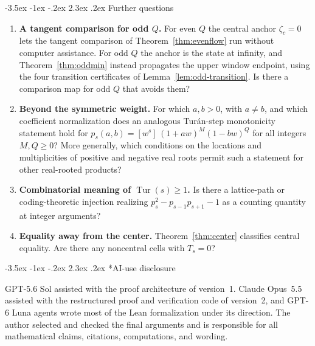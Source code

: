 \documentclass[twoside,10pt]{article}
\makeatletter
\numberwithin{equation}{section}
\theoremstyle{slbody}
\theoremstyle{definition}
\theoremstyle{remark}
\numberwithin{theorem}{section}
\DeclareMathOperator{\Tur}{Tur}
\newcommand{\coeff}[1]{[#1]\,}
\renewcommand{\section}{%
  \@startsection{section}{1}{\z@}%
    {-3.5ex \@plus -1ex \@minus -.2ex}%
    {2.3ex \@plus .2ex}%
    {\normalfont\large\bfseries}}
\makeatother
\begin{document}
\section{Further questions}\label{sec:open}

\begin{enumerate}
\item \textbf{A tangent comparison for odd $Q$.}  For even $Q$ the central
  anchor $\zeta_c=0$ lets the tangent comparison of
  Theorem~\ref{thm:evenflow} run without computer assistance.  For odd $Q$
  the anchor is the state at infinity, and Theorem~\ref{thm:oddmin}
  instead propagates the upper window endpoint, using the four transition
  certificates of Lemma~\ref{lem:odd-transition}.  Is there a comparison map
  for odd $Q$ that avoids them?
\item \textbf{Beyond the symmetric weight.}  For which $a,b>0$, with
  $a\ne b$, and which coefficient normalization does an analogous
  Tur\'an-step monotonicity statement hold for
  $p_s(a,b)=\coeff{w^s}(1+aw)^M(1-bw)^Q$ for all integers $M,Q\ge0$?
  More generally, which conditions on the locations and multiplicities
  of positive and negative real roots permit such a statement for other
  real-rooted products?
\item \textbf{Combinatorial meaning of $\Tur(s)\ge 1$.}
  Is there a lattice-path or coding-theoretic injection
  realizing $p_s^2-p_{s-1}p_{s+1}-1$ as a counting quantity at integer
  arguments?
\item \textbf{Equality away from the center.}  Theorem~\ref{thm:center}
  classifies central equality.  Are there any noncentral cells with
  $T_s=0$?
\end{enumerate}

\noindent\begin{minipage}{\textwidth}
\section*{AI-use disclosure}

GPT-5.6 Sol assisted with the proof architecture of version~1.  Claude
Opus~5.5 assisted with the restructured proof and verification code of
version~2, and GPT-6 Luna agents wrote most of the Lean formalization under
its direction.  The author selected and checked the final arguments and is
responsible for all mathematical claims, citations, computations, and
wording.
\end{minipage}

\begingroup
\small
\raggedright
{}


\endgroup
\end{document}

